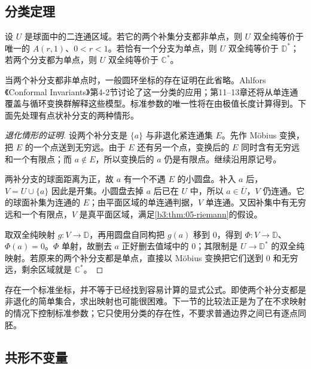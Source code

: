 \subsection{分类定理}
\label{b3:subsec:080103}

\begin{theorem}[深层二连通分类]\label{b3:thm:08-annulus-classification}
设 \(U\) 是球面中的二连通区域。若它的两个补集分支都非单点，则 \(U\) 双全纯等价于唯一的 \(A(r,1)\)、\(0<r<1\)。若恰有一个分支为单点，则 \(U\) 双全纯等价于 \(\mathbb D^*\)；若两个分支都为单点，则 \(U\) 双全纯等价于 \(\mathbb C^*\)。
\end{theorem}
\begin{proofsketch}[非退化情形的存在性]
当两个补分支都非单点时，一般圆环坐标的存在证明在此省略。Ahlfors《Conformal Invariants》\cite{Ahlfors2010Conformal}第4-2节讨论了这一分类的应用；第11--13章还将从单连通覆盖与循环变换群解释这些模型。标准参数的唯一性将在由极值长度计算得到。下面先处理有点状补分支的两种情形。
\end{proofsketch}
\begin{proof}[退化情形的证明]
设两个补分支是 \(\{a\}\) 与非退化紧连通集 \(E\)。先作 Möbius 变换，把 \(E\) 的一个点送到无穷远。由于 \(E\) 还有另一个点，变换后的 \(E\) 同时含有无穷远和一个有限点；而 \(a\notin E\)，所以变换后的 \(a\) 仍是有限点。继续沿用原记号。

两补分支的球面距离为正，故 \(a\) 有一个不遇 \(E\) 的小圆盘。补入 \(a\) 后，\(V=U\cup\{a\}\) 因此是开集。小圆盘去掉 \(a\) 后已在 \(U\) 中，所以 \(a\in\overline U\)，\(V\) 仍连通。它的球面补集为连通的 \(E\)；由平面区域的单连通判据，\(V\) 单连通。又因补集中有无穷远和一个有限点，\(V\) 是真平面区域，满足\cref{b3:thm:05-riemann}的假设。

取双全纯映射 \(g:V\to\mathbb D\)，再用圆盘自同构把 \(g(a)\) 移到 \(0\)，得到 \(\Phi:V\to\mathbb D\)、\(\Phi(a)=0\)。\(\Phi\) 单射，故删去 \(a\) 正好删去值域中的 \(0\)；其限制是 \(U\to\mathbb D^*\) 的双全纯映射。若原来的两个补分支都是单点，直接以 Möbius 变换把它们送到 \(0\) 和无穷远，剩余区域就是 \(\mathbb C^*\)。
\end{proof}
存在一个标准坐标，并不等于已经找到容易计算的显式公式。即使两个补分支都是非退化的简单集合，求出映射也可能很困难。下一节的比较法正是为了在不求映射的情况下控制标准参数；它只使用分类的存在性，不要求普通边界之间已有逐点同胚。

\subsection{共形不变量}
\label{b3:subsec:080104}

